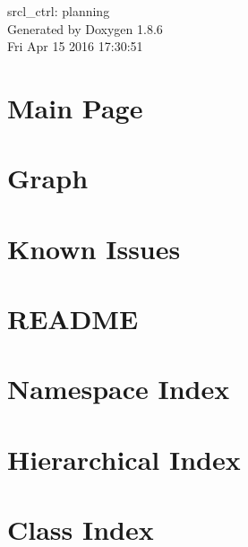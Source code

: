 \documentclass[twoside]{book}
\newcommand{\clearemptydoublepage}{%
  \newpage{\pagestyle{empty}\cleardoublepage}%
}
\begin{document}
\hypersetup{pageanchor=false}
\begin{titlepage}
\vspace*{7cm}
\begin{center}%
{\Large srcl\-\_\-ctrl\-: planning }\\
\vspace*{1cm}
{\large Generated by Doxygen 1.8.6}\\
\vspace*{0.5cm}
{\small Fri Apr 15 2016 17:30:51}\\
\end{center}
\end{titlepage}
\clearemptydoublepage
\tableofcontents
\clearemptydoublepage
{}
\hypersetup{pageanchor=true}

\chapter{Main Page}
\label{index}\hypertarget{index}{}
\chapter{Graph}
\label{graph}
\hypertarget{graph}{}

\chapter{Known Issues}
\label{known_issues}
\hypertarget{known_issues}{}

\chapter{R\-E\-A\-D\-M\-E}
\label{md__home_rdu_Workspace_srcl_robot_suite_srcl_ctrl_planning_src_graph_README}
\hypertarget{md__home_rdu_Workspace_srcl_robot_suite_srcl_ctrl_planning_src_graph_README}{}

\chapter{Namespace Index}

\chapter{Hierarchical Index}

\chapter{Class Index}

\end{document}
